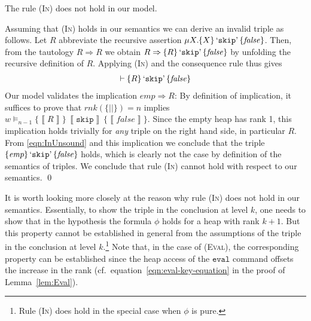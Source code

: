 \documentclass{LMCS}
\theoremstyle{remark}
\newcommand{\QUOTE}[1]{\textnormal{`\ensuremath{#1}'}}
\newcommand{\SYN}[1]{\ensuremath{\texttt{#1}}}
\newcommand{\record}[1]{\ensuremath{\left.\!\{\!|{#1}|\!\}\right.\!}}
\newcommand{\triple}[3]{{\ensuremath{\!\left.\{ #1 \}\, #2\, \{  #3 \}\!\right.}}}
\newcommand{\False}{\ensuremath{\mathit{false}}}
\newcommand{\EMP}{\ensuremath{\textit{emp}}}
\newcommand{\rnk}[1]{\textit{rnk}(#1)}
\newcommand{\den}[1]{\left\llbracket #1
  \right\rrbracket}
\begin{document}
\begin{prop}
\label{prop:InUnsoundness}
The rule (\textsc{In}) does not hold in our model. 
\end{prop}
\proof
Assuming that (\textsc{In}) holds in our semantics we can derive an invalid triple as follows.  
Let $R$ abbreviate the recursive assertion $\mu X.\triple{X}{\QUOTE{\SYN{skip}}}{\False}$. Then, from the tautology $R\Rightarrow R$ we obtain 
$R\Rightarrow\triple{R}{\QUOTE{\SYN{skip}}}{\False}$ by unfolding the recursive definition of $R$. 
Applying (\textsc{In}) and the consequence rule thus gives
\begin{align}
\label{eqn:InUnsound}
\adash \triple{ R}{\QUOTE{\SYN{skip}}}{\False}
\end{align}
Our model validates the implication $\EMP \Rightarrow R$: 
By definition of implication, it suffices to prove that $\rnk{\record{}}=n$ implies $w\models_{n{-}1}\triple{\den{R}}{\den{\SYN{skip}}}{\den{\False}}$. 
Since the empty heap has rank 1, this implication holds trivially for \emph{any} triple on the right hand side, 
in particular $R$.
From \eqref{eqn:InUnsound} and this implication we conclude that the triple
$\triple{ \EMP}{\QUOTE{\SYN{skip}}}{\False}$ holds, which is clearly not the case by definition of the semantics of triples. 
We conclude that rule (\textsc{In}) cannot hold with respect to our semantics. \qed



It is worth looking more closely at the reason why rule (\textsc{In}) does not hold in our semantics. 
Essentially, to show the triple in the conclusion at level $k$, one needs to show that in the hypothesis the formula $\phi$ holds for a heap with rank $k+1$. But this property cannot be established in general from the assumptions of the triple in the conclusion at level $k$.\footnote{Rule \textsc{(In)} does hold in the special case when $\phi$ is pure. } 
Note that, in the case of (\textsc{Eval}), the corresponding property can be established since the heap access of the \SYN{eval} command offsets the increase in the rank   (cf.\ equation~\eqref{eqn:eval-key-equation} in the proof of Lemma~\ref{lem:Eval}). 
\end{document}
